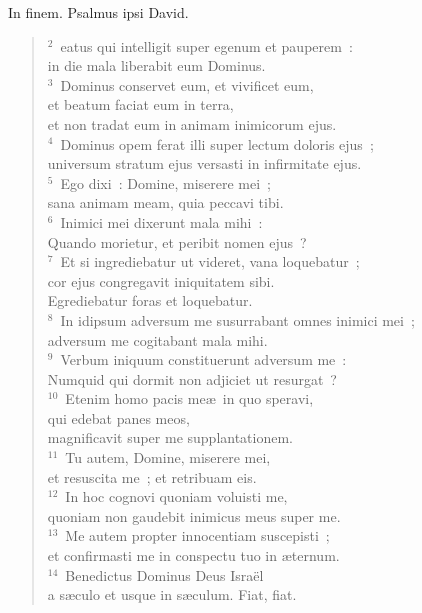 \bchapter[Psalm]
In finem. Psalmus ipsi David.
\begin{verse}${}^{2}$~eatus qui intelligit super egenum et pauperem~:\\ in die mala liberabit eum Dominus.\\
${}^{3}$~Dominus conservet eum, et vivificet eum,\\ et beatum faciat eum in terra,\\ et non tradat eum in animam inimicorum ejus.\\
${}^{4}$~Dominus opem ferat illi super lectum doloris ejus~;\\ universum stratum ejus versasti in infirmitate ejus.\\
${}^{5}$~Ego dixi~: Domine, miserere mei~;\\ sana animam meam, quia peccavi tibi.\\
${}^{6}$~Inimici mei dixerunt mala mihi~:\\ Quando morietur, et peribit nomen ejus~?\\
${}^{7}$~Et si ingrediebatur ut videret, vana loquebatur~;\\ cor ejus congregavit iniquitatem sibi.\\ Egrediebatur foras et loquebatur.\\
${}^{8}$~In idipsum adversum me susurrabant omnes inimici mei~;\\ adversum me cogitabant mala mihi.\\
${}^{9}$~Verbum iniquum constituerunt adversum me~:\\ Numquid qui dormit non adjiciet ut resurgat~?\\
${}^{10}$~Etenim homo pacis me\ae\ in quo speravi,\\ qui edebat panes meos,\\ magnificavit super me supplantationem.\\
${}^{11}$~Tu autem, Domine, miserere mei,\\ et resuscita me~; et retribuam eis.\\
${}^{12}$~In hoc cognovi quoniam voluisti me,\\ quoniam non gaudebit inimicus meus super me.\\
${}^{13}$~Me autem propter innocentiam suscepisti~;\\ et confirmasti me in conspectu tuo in \ae ternum.\\
${}^{14}$~Benedictus Dominus Deus Isra\"el\\ a s\ae culo et usque in s\ae culum. Fiat, fiat.\end{verse}



